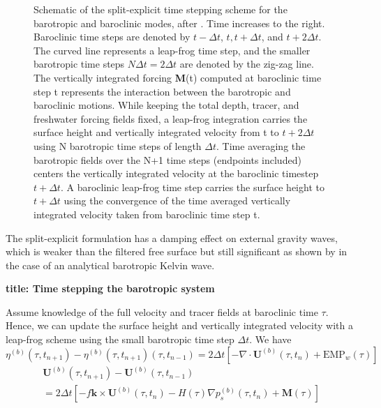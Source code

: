 \documentclass[../main/NEMO_manual]{subfiles}
\begin{document}
\begin{figure}[!t]
  \centering
  \caption[Schematic of the split-explicit time stepping scheme for
  the barotropic and baroclinic modes, after \citet{Griffies2004?}]{
    Schematic of the split-explicit time stepping scheme for the barotropic and baroclinic modes,
    after \citet{Griffies2004?}.
    Time increases to the right.
    Baroclinic time steps are denoted by $t-\Delta t$, $t, t+\Delta t$, and $t+2\Delta t$.
    The curved line represents a leap-frog time step,
    and the smaller barotropic time steps $N \Delta t=2\Delta t$ are denoted by the zig-zag line.
    The vertically integrated forcing \textbf{M}(t) computed at
    baroclinic time step t represents the interaction between the barotropic and baroclinic motions.
    While keeping the total depth, tracer, and freshwater forcing fields fixed,
    a leap-frog integration carries the surface height and vertically integrated velocity from
    t to $t+2 \Delta t$ using N barotropic time steps of length $\Delta t$.
    Time averaging the barotropic fields over the N+1 time steps (endpoints included)
    centers the vertically integrated velocity at the baroclinic timestep $t+\Delta t$.
    A baroclinic leap-frog time step carries the surface height to $t+\Delta t$ using
    the convergence of the time averaged vertically integrated velocity taken from
    baroclinic time step t.}
  \label{fig:MBZ_dyn_dynspg_ts}
\end{figure}

The split-explicit formulation has a damping effect on external gravity waves,
which is weaker than the filtered free surface but still significant as shown by \citet{levier.treguier.ea_rpt07} in
the case of an analytical barotropic Kelvin wave.


\textbf{title: Time stepping the barotropic system }

Assume knowledge of the full velocity and tracer fields at baroclinic time $\tau$.
Hence, we can update the surface height and vertically integrated velocity with a leap-frog scheme using
the small barotropic time step $\Delta t$.
We have
\[
  \eta^{(b)}(\tau,t_{n+1}) - \eta^{(b)}(\tau,t_{n+1}) (\tau,t_{n-1})
  = 2 \Delta t \left[-\nabla \cdot \textbf{U}^{(b)}(\tau,t_n) + \text{EMP}_w(\tau) \right]
\]
\begin{multline*}
  \textbf{U}^{(b)}(\tau,t_{n+1}) - \textbf{U}^{(b)}(\tau,t_{n-1})  \\
  = 2\Delta t \left[ - f \textbf{k} \times \textbf{U}^{(b)}(\tau,t_{n})
    - H(\tau) \nabla p_s^{(b)}(\tau,t_{n}) +\textbf{M}(\tau) \right]
\end{multline*}
\
\end{document}

